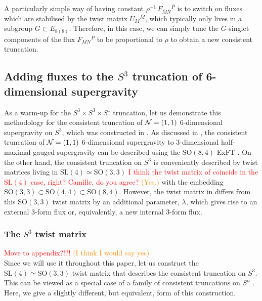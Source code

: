 \documentclass[a4paper, 11pt]{article}
\numberwithin{equation}{section}
\newcommand{\ov}[1]{\overline{#1}}
\newcommand{\SL}[1]{\mathrm{SL}( #1 )}
\newcommand{\SO}[1]{\mathrm{SO}( #1 )}
\newcommand{\EE}{\ensuremath{E_{8(8)}}\xspace}
\newcommand{\+}{\oplus}
\newcommand{\fl}[1]{\ov{#1}}
\newcommand{\EM}[1]{\textcolor{red}{#1}}
\newcommand{\CE}[1]{\textcolor{darkorange}{#1}}
\begin{document}
A particularly simple way of having constant $\rho^{-1}\, F_{\fl{M}\fl{N}}{}^{\fl{P}}$ is to switch on fluxes which are stabilised by the twist matrix $U_M{}^{\fl{M}}$, which typically only lives in a subgroup $G \subset \EE$. Therefore, in this case, we can simply tune the $G$-singlet components of the flux $F_{MN}{}^P$ to be proportional to $\rho$ to obtain a new consistent truncation.

\subsection{Adding fluxes to the $S^3$ truncation of 6-dimensional supergravity} \label{s:S3Flux}
As a warm-up for the $S^3 \times S^3 \times S^1$ truncation, let us demonstrate this methodology for the consistent truncation of ${\cal N}=(1,1)$ 6-dimensional supergravity on $S^3$, which was constructed in \cite{Eloy:2021fhc}. As discussed in \cite{Eloy:2021fhc}, the consistent truncation of ${\cal N}=(1,1)$ 6-dimensional supergravity to 3-dimensional half-maximal gauged supergravity can be described using the $\SO{8,4}$ ExFT \cite{Hohm:2017wtr,Samtleben:2019zrh}. On the other hand, the consistent truncation on $S^3$ is conveniently described by twist matrices living in $\SL{4} \simeq \SO{3,3}$ \cite{Lee:2014mla,Hohm:2014qga,Baguet:2015iou} \EM{I think the twist matrix of \cite{Baguet:2015iou,Lee:2014mla,Hohm:2014qga} coincide in the $\SL{4}$ case, right? Camille, do you agree?} \CE{(Yes.)} with the embedding $\SO{3,3} \subset \SO{4,4} \subset \SO{8,4}$. However, the twist matrix in \cite{Eloy:2021fhc} differs from this $\SO{3,3}$ twist matrix \cite{Lee:2014mla,Hohm:2014qga,Baguet:2015iou} by an additional parameter, $\lambda$, which gives rise to an external 3-form flux or, equivalently, a new internal 3-form flux.

\subsubsection{The $S^3$ twist matrix}
\EM{Move to appendix?!?!} \CE{(I think I would say yes)}\\
Since we will use it throughout this paper, let us construct the $\SL{4} \simeq \SO{3,3}$ twist matrix that describes the consistent truncation on $S^3$. This can be viewed as a special case of a family of consistent truncations on $S^n$ \cite{Lee:2014mla,Hohm:2014qga,Baguet:2015iou}. Here, we give a slightly different, but equivalent, form of this construction.
\end{document}

